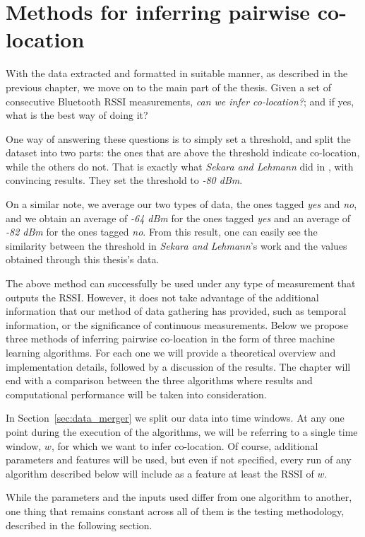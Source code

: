 \chapter{Methods for inferring pairwise co-location}

With the data extracted and formatted in suitable manner, as described in the previous chapter, we move on to the main part of the thesis. Given a set of consecutive Bluetooth RSSI measurements, \textit{can we infer co-location?}; and if yes, what is the best way of doing it? 

One way of answering these questions is to simply set a threshold, and split the dataset into two parts: the ones that are above the threshold indicate co-location, while the others do not. That is exactly what \textit{Sekara and Lehmann} did in \cite{vedran}, with convincing results. They set the threshold to \textit{ -80 dBm}. 

On a similar note, we average our two types of data, the ones tagged \textit{yes} and \textit{no}, and we obtain an average of \textit{-64 dBm} for the ones tagged \textit{yes} and an average of \textit{-82 dBm} for the ones tagged \textit{no}. From this result, one can easily see the similarity between the threshold in \textit{Sekara and Lehmann}'s work and the values obtained through this thesis's data. 

The above method can successfully be used under any type of measurement that outputs the RSSI. However, it does not take advantage of the additional information that our method of data gathering has provided, such as temporal information, or the significance of continuous measurements. Below we propose three methods of inferring pairwise co-location in the form of three machine learning algorithms. For each one we will provide a theoretical overview and implementation details, followed by a discussion of the results. The chapter will end with a comparison between the three algorithms where results and computational performance will be taken into consideration.

In Section~\ref{sec:data_merger} we split our data into time windows. At any one point during the execution of the algorithms, we will be referring to a single time window, $w$, for which we want to infer co-location. Of course, additional parameters and features will be used, but even if not specified, every run of any algorithm described below will include as a feature at least the RSSI of $w$.
 
While the parameters and the inputs used differ from one algorithm to another, one thing that remains constant across all of them is the testing methodology, described in the following section.

